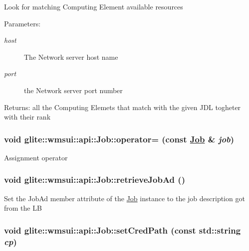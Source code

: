 Look for matching Computing Element available resources \begin{Desc}
\item[Parameters:]
\begin{description}
\item[{\em host}]The Network server host name \item[{\em port}]the Network server port number \end{description}
\end{Desc}
\begin{Desc}
\item[Returns:]all the Computing Elemets that match with the given JDL togheter with their rank \end{Desc}
\hypertarget{classglite_1_1wmsui_1_1api_1_1Job_z15_5}{
\subsubsection[operator=]{\setlength{\rightskip}{0pt plus 5cm}void glite::wmsui::api::Job::operator= (const \hyperlink{classglite_1_1wmsui_1_1api_1_1Job}{Job} \& {\em job})}}
\label{classglite_1_1wmsui_1_1api_1_1Job_z15_5}


Assignment operator \hypertarget{classglite_1_1wmsui_1_1api_1_1Job_z17_7}{
\subsubsection[retrieveJobAd]{\setlength{\rightskip}{0pt plus 5cm}void glite::wmsui::api::Job::retrieve\-Job\-Ad ()}}
\label{classglite_1_1wmsui_1_1api_1_1Job_z17_7}


Set the Job\-Ad member attribute of the \hyperlink{classglite_1_1wmsui_1_1api_1_1Job}{Job} instance to the job description got from the LB \hypertarget{classglite_1_1wmsui_1_1api_1_1Job_z17_2}{
\subsubsection[setCredPath]{\setlength{\rightskip}{0pt plus 5cm}void glite::wmsui::api::Job::set\-Cred\-Path (const std::string {\em cp})}}
\label{classglite_1_1wmsui_1_1api_1_1Job_z17_2}


